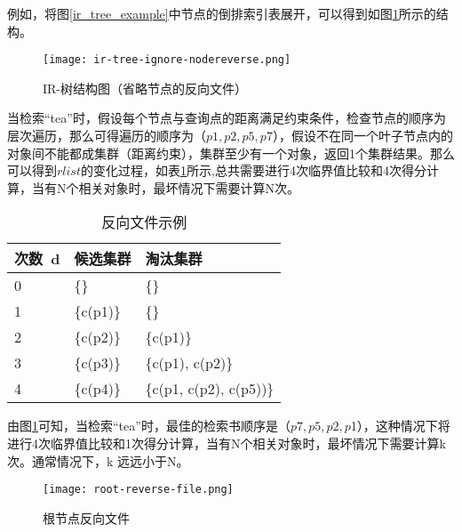 例如，将图\ref{ir_tree_example}中节点的倒排索引表展开，可以得到如图\ref{ir_tree_structure_ig_node_rev_file}所示的结构。

\begin{figure}[htbp]
	\begin{center}
		\texttt{[image: ir-tree-ignore-nodereverse.png]}
		\caption{IR-树结构图（省略节点的反向文件）}
		\label{ir_tree_structure_ig_node_rev_file}
	\end{center}
\end{figure}

当检索“tea”时，假设每个节点与查询点的距离满足约束条件，检查节点的顺序为层次遍历，那么可得遍历的顺序为（$p1,p2,p5,p$7），假设不在同一个叶子节点内的对象间不能都成集群（距离约束），集群至少有一个对象，返回1个集群结果。那么可以得到$rlist$的变化过程，如表\ref{cluster_table}所示,总共需要进行4次临界值比较和4次得分计算，当有N个相关对象时，最坏情况下需要计算N次。

\begin{table}[h!]
  \begin{center}
    \caption{反向文件示例}
    \label{cluster_table} 
    \begin{tabular}{l|l|l} %
      \textbf{次数\ d} & \textbf{候选集群} & \textbf{淘汰集群} \\
			\hline
			0 & \{\}& \{\} \\
			1 & \{c(p1)\} & \{\} \\
			2 & \{c(p2)\} & \{c(p1)\} \\
			3 & \{c(p3)\} & \{c(p1), c(p2)\} \\
			4 & \{c(p4)\} & \{c(p1, c(p2), c(p5))\} \\
    \end{tabular}
  \end{center}
\end{table}

由图\ref{ir_tree_structure_ig_node_rev_file}可知，当检索“tea”时，最佳的检索书顺序是（$p7,p5,p2,p$1），这种情况下将进行4次临界值比较和1次得分计算，当有N个相关对象时，最坏情况下需要计算k次。通常情况下，k 远远小于N。

\begin{figure}[htbp]
	\begin{center}
		\texttt{[image: root-reverse-file.png]}
		\caption{根节点反向文件}
		\label{root_reverse_file}
	\end{center}
\end{figure}